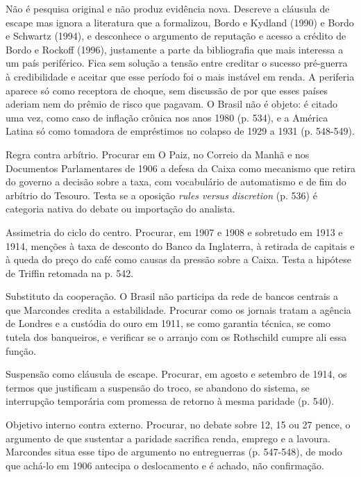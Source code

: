 Não é pesquisa original e não produz evidência nova. Descreve a cláusula de escape
mas ignora a literatura que a formalizou, Bordo e Kydland (1990) e Bordo e
Schwartz (1994), e desconhece o argumento de reputação e acesso a crédito de Bordo
e Rockoff (1996), justamente a parte da bibliografia que mais interessa a um país
periférico. Fica sem solução a tensão entre creditar o sucesso pré-guerra à
credibilidade e aceitar que esse período foi o mais instável em renda. A periferia
aparece só como receptora de choque, sem discussão de por que esses países aderiam
nem do prêmio de risco que pagavam. O Brasil não é objeto: é citado uma vez, como
caso de inflação crônica nos anos 1980 (p. 534), e a América Latina só como
tomadora de empréstimos no colapso de 1929 a 1931 (p. 548-549).

\begin{dialogo}
\item Regra contra arbítrio. Procurar em O Paiz, no Correio da Manhã e nos
Documentos Parlamentares de 1906 a defesa da Caixa como mecanismo que retira do
governo a decisão sobre a taxa, com vocabulário de automatismo e de fim do arbítrio
do Tesouro. Testa se a oposição \textit{rules versus discretion} (p. 536) é
categoria nativa do debate ou importação do analista.
\item Assimetria do ciclo do centro. Procurar, em 1907 e 1908 e sobretudo em 1913
e 1914, menções à taxa de desconto do Banco da Inglaterra, à retirada de capitais
e à queda do preço do café como causas da pressão sobre a Caixa. Testa a hipótese
de Triffin retomada na p. 542.
\item Substituto da cooperação. O Brasil não participa da rede de bancos centrais
a que Marcondes credita a estabilidade. Procurar como os jornais tratam a agência
de Londres e a custódia do ouro em 1911, se como garantia técnica, se como tutela
dos banqueiros, e verificar se o arranjo com os Rothschild cumpre ali essa função.
\item Suspensão como cláusula de escape. Procurar, em agosto e setembro de 1914,
os termos que justificam a suspensão do troco, se abandono do sistema, se
interrupção temporária com promessa de retorno à mesma paridade (p. 540).
\item Objetivo interno contra externo. Procurar, no debate sobre 12, 15 ou 27
pence, o argumento de que sustentar a paridade sacrifica renda, emprego e a
lavoura. Marcondes situa esse tipo de argumento no entreguerras (p. 547-548), de
modo que achá-lo em 1906 antecipa o deslocamento e é achado, não confirmação.
\end{dialogo}

